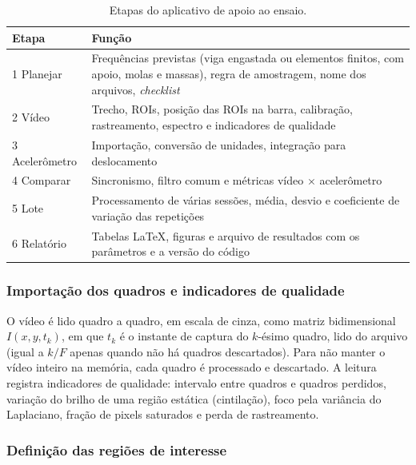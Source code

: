 \documentclass[a4paper,10pt,twocolumn]{article}
\begin{document}
\begin{table}[htbp]
    \centering
    \caption{Etapas do aplicativo de apoio ao ensaio.}
    \label{tab:etapas_app}
    \small
    \begin{tabularx}{\columnwidth}{l X}
        \toprule
        \textbf{Etapa} & \textbf{Função} \\
        \midrule
        1 Planejar & Frequências previstas (viga engastada ou elementos finitos, com apoio, molas e massas), regra de amostragem, nome dos arquivos, \textit{checklist} \\
        2 Vídeo & Trecho, ROIs, posição das ROIs na barra, calibração, rastreamento, espectro e indicadores de qualidade \\
        3 Acelerômetro & Importação, conversão de unidades, integração para deslocamento \\
        4 Comparar & Sincronismo, filtro comum e métricas vídeo $\times$ acelerômetro \\
        5 Lote & Processamento de várias sessões, média, desvio e coeficiente de variação das repetições \\
        6 Relatório & Tabelas \LaTeX, figuras e arquivo de resultados com os parâmetros e a versão do código \\
        \bottomrule
    \end{tabularx}
\end{table}

\subsubsection{Importação dos quadros e indicadores de qualidade}

O vídeo é lido quadro a quadro, em escala de cinza, como matriz bidimensional $I(x,y,t_k)$, em que $t_k$ é o instante de captura do $k$-ésimo quadro, lido do arquivo (igual a $k/F$ apenas quando não há quadros descartados). Para não manter o vídeo inteiro na memória, cada quadro é processado e descartado. A leitura registra indicadores de qualidade: intervalo entre quadros e quadros perdidos, variação do brilho de uma região estática (cintilação), foco pela variância do Laplaciano, fração de pixels saturados e perda de rastreamento.

\subsubsection{Definição das regiões de interesse}
\end{document}
